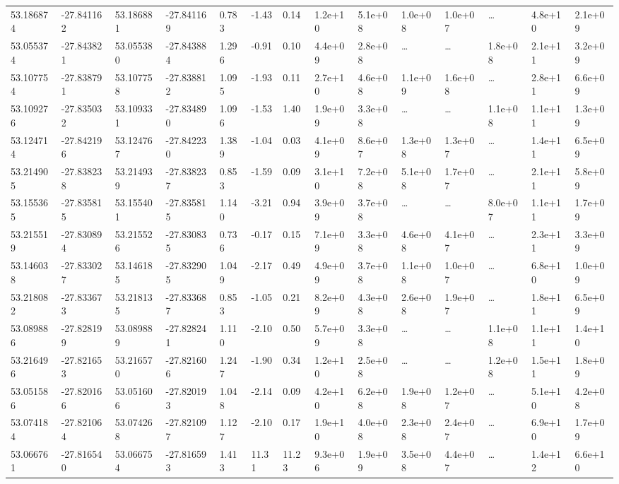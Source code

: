\documentclass[referee]{aa}
\begin{document}
{\begin{landscape}
\begin{longtable}{llllllllllllll}
53.186874 & -27.841162 & 53.186881 & -27.841169 & 0.783 & -1.43 & 0.14 & 1.2e+10 & 5.1e+08 & 1.0e+08 & 1.0e+07 & \ldots & 4.8e+10 & 2.1e+09  \\
53.055374 & -27.843821 & 53.055380 & -27.843884 & 1.296 & -0.91 & 0.10 & 4.4e+09 & 2.8e+08 & \ldots & \ldots & 1.8e+08 & 2.1e+11 & 3.2e+09  \\
53.107754 & -27.838791 & 53.107758 & -27.838812 & 1.095 & -1.93 & 0.11 & 2.7e+10 & 4.6e+08 & 1.1e+09 & 1.6e+08 & \ldots & 2.8e+11 & 6.6e+09  \\
53.109276 & -27.835032 & 53.109331 & -27.834890 & 1.096 & -1.53 & 1.40 & 1.9e+09 & 3.3e+08 & \ldots & \ldots & 1.1e+08 & 1.1e+11 & 1.3e+09  \\
53.124714 & -27.842196 & 53.124767 & -27.842230 & 1.389 & -1.04 & 0.03 & 4.1e+09 & 8.6e+07 & 1.3e+08 & 1.3e+07 & \ldots & 1.4e+11 & 6.5e+09  \\
53.214905 & -27.838238 & 53.214939 & -27.838237 & 0.853 & -1.59 & 0.09 & 3.1e+10 & 7.2e+08 & 5.1e+08 & 1.7e+07 & \ldots & 2.1e+11 & 5.8e+09  \\
53.155365 & -27.835815 & 53.155401 & -27.835815 & 1.140 & -3.21 & 0.94 & 3.9e+09 & 3.7e+08 & \ldots & \ldots & 8.0e+07 & 1.1e+11 & 1.7e+09  \\
53.215519 & -27.830894 & 53.215526 & -27.830835 & 0.736 & -0.17 & 0.15 & 7.1e+09 & 3.3e+08 & 4.6e+08 & 4.1e+07 & \ldots & 2.3e+11 & 3.3e+09  \\
53.146038 & -27.833027 & 53.146185 & -27.832905 & 1.049 & -2.17 & 0.49 & 4.9e+09 & 3.7e+08 & 1.1e+08 & 1.0e+07 & \ldots & 6.8e+10 & 1.0e+09  \\
53.218082 & -27.833673 & 53.218135 & -27.833687 & 0.853 & -1.05 & 0.21 & 8.2e+09 & 4.3e+08 & 2.6e+08 & 1.9e+07 & \ldots & 1.8e+11 & 6.5e+09  \\
53.089886 & -27.828199 & 53.089889 & -27.828241 & 1.110 & -2.10 & 0.50 & 5.7e+09 & 3.3e+08 & \ldots & \ldots & 1.1e+08 & 1.1e+11 & 1.4e+10  \\
53.216496 & -27.821653 & 53.216570 & -27.821606 & 1.247 & -1.90 & 0.34 & 1.2e+10 & 2.5e+08 & \ldots & \ldots & 1.2e+08 & 1.5e+11 & 1.8e+09  \\
53.051586 & -27.820166 & 53.051606 & -27.820193 & 1.048 & -2.14 & 0.09 & 4.2e+10 & 6.2e+08 & 1.9e+08 & 1.2e+07 & \ldots & 5.1e+10 & 4.2e+08  \\
53.074184 & -27.821064 & 53.074268 & -27.821097 & 1.127 & -2.10 & 0.17 & 1.9e+10 & 4.0e+08 & 2.3e+08 & 2.4e+07 & \ldots & 6.9e+10 & 1.7e+09  \\
53.066761 & -27.816540 & 53.066754 & -27.816593 & 1.413 & 11.31 & 11.23 & 9.3e+06 & 1.9e+09 & 3.5e+08 & 4.4e+07 & \ldots & 1.4e+12 & 6.6e+10  \\

\end{longtable}
\end{landscape}}
\end{document}
